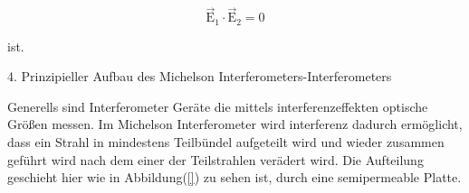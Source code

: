             \begin{equation}
                \vec{\text{E}}_1 \cdot \vec{\text{E}}_2 = 0
            \end{equation}

            ist.

        4. Prinzipieller Aufbau des Michelson Interferometers-Interferometers

            Generells sind Interferometer Geräte die mittels interferenzeffekten optische Größen messen. Im Michelson Interferometer wird 
            interferenz dadurch ermöglicht, dass ein Strahl in mindestens Teilbündel aufgeteilt wird und wieder zusammen geführt wird nach  
            dem einer der Teilstrahlen verädert wird. Die Aufteilung geschieht hier wie in Abbildung(\ref{}) zu sehen ist, 
            durch eine semipermeable Platte.





